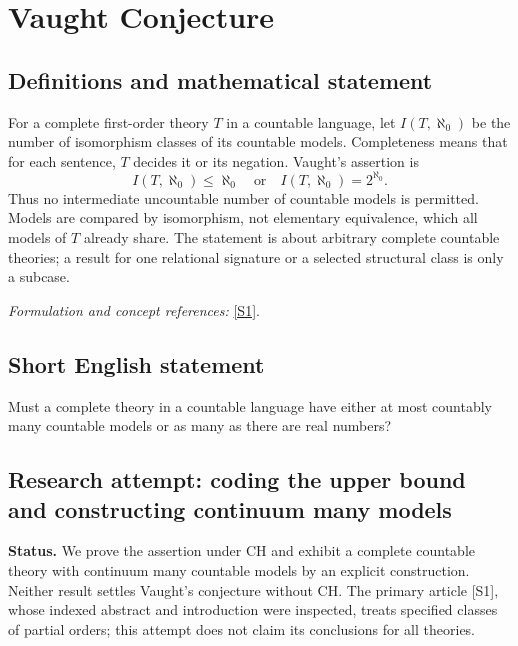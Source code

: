 \documentclass[11pt]{article}
\begin{document}
\section*{\texorpdfstring{Vaught Conjecture}{Vaught Conjecture}}\label{statement}
\subsection{Definitions and mathematical statement}
For a complete first-order theory $T$ in a countable language, let $I(T,\aleph_0)$ be the number of isomorphism classes of its countable models. Completeness means that for each sentence, $T$ decides it or its negation. Vaught's assertion is
\[
 I(T,\aleph_0)\le\aleph_0\quad\text{or}\quad I(T,\aleph_0)=2^{\aleph_0}.
\]
Thus no intermediate uncountable number of countable models is permitted. Models are compared by isomorphism, not elementary equivalence, which all models of $T$ already share. The statement is about arbitrary complete countable theories; a result for one relational signature or a selected structural class is only a subcase.
\par\smallskip\textit{Formulation and concept references:} \href{https://www.sciencedirect.com/science/article/abs/pii/S0168007224000083}{[S1]}.

\subsection{Short English statement}
Must a complete theory in a countable language have either at most countably many countable models or as many as there are real numbers?
\subsection{Research attempt: coding the upper bound and constructing continuum many models}
\textbf{Status.} We prove the assertion under CH and exhibit a complete countable theory with continuum many countable models by an explicit construction. Neither result settles Vaught's conjecture without CH. The primary article [S1], whose indexed abstract and introduction were inspected, treats specified classes of partial orders; this attempt does not claim its conclusions for all theories.
\end{document}
